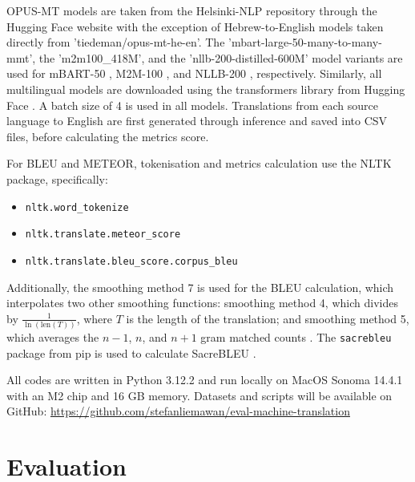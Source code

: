 \documentclass[a4paper, 11pt]{article}
\begin{document}
OPUS-MT models are taken from the Helsinki-NLP repository through the Hugging Face website \cite{huggingface,zhang-2023-fine-tuning} with the exception of Hebrew-to-English models taken directly from 'tiedeman/opus-mt-he-en'. The 'mbart-large-50-many-to-many-mmt', the 'm2m100\_418M', and the 'nllb-200-distilled-600M' model variants are used for mBART-50 \cite{liu-2020-mbart}, M2M-100 \cite{fan-2020-m2m100}, and NLLB-200 \cite{nllb200-2020}, respectively. Similarly, all multilingual models are downloaded using the transformers \cite{wolf-2020-transformers} library from Hugging Face \cite{huggingface}. A batch size of 4 is used in all models. Translations from each source language to English are first generated through inference and saved into CSV files, before calculating the metrics score.

For BLEU and METEOR, tokenisation and metrics calculation use the NLTK \cite{bird-2009-natural} package, specifically:
\begin{itemize}
    \item \texttt{nltk.word\_tokenize} \\
    \item \texttt{nltk.translate.meteor\_score} \\
    \item \texttt{nltk.translate.bleu\_score.corpus\_bleu}
\end{itemize}
Additionally, the smoothing method 7 is used for the BLEU calculation, which interpolates two other smoothing functions: smoothing method 4, which divides by \( \frac{1}{\ln(\text{len}(T))} \), where \( T \) is the length of the translation; and smoothing method 5, which averages the \( n-1 \), \( n \), and \( n+1 \) gram matched counts \cite{nltk-bleu-docs}. The \texttt{sacrebleu} \cite{post-2018-sacrebleu} package from pip is used to calculate SacreBLEU \cite{post-2018-sacrebleu}.

All codes are written in Python 3.12.2 and run locally on MacOS Sonoma 14.4.1 with an M2 chip and 16 GB memory. Datasets and scripts will be available on GitHub: \url{https://github.com/stefanliemawan/eval-machine-translation}

\section{Evaluation}
\end{document}
